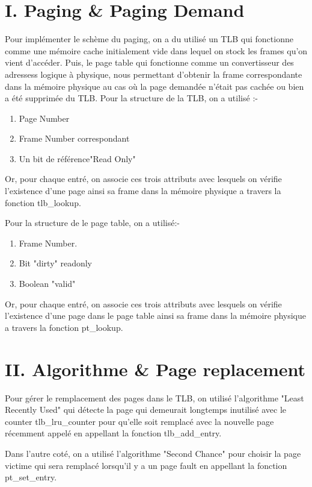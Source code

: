 \documentclass{article}
\begin{document}
\section*{I. Paging \& Paging Demand}
Pour implémenter le schème du paging, on a du utilisé un TLB qui fonctionne comme une mémoire cache initialement vide dans lequel on stock les frames qu'on vient d'accéder. Puis, le page table qui fonctionne comme un convertisseur des adressess logique à physique, nous permettant d'obtenir la frame correspondante dans la mémoire physique au cas où la page demandée n'était pas cachée ou bien a été supprimée du TLB.
Pour la structure de la TLB, on a utilisé :-
\begin{enumerate}
	\item Page Number
	\item Frame Number correspondant
	\item Un bit de référence"Read Only" 
\end{enumerate}
Or, pour chaque entré, on associe ces trois attributs avec lesquels on vérifie l'existence d'une page ainsi sa frame dans la mémoire physique a travers la fonction tlb\_lookup. 

Pour la structure de le page table, on a utilisé:-
\begin{enumerate}
	\item Frame Number.
	\item Bit "dirty" readonly
	\item Boolean "valid"
\end{enumerate}
Or, pour chaque entré, on associe ces trois attributs avec lesquels on vérifie l'existence d'une page dans le page table ainsi sa frame dans la mémoire physique a travers la fonction pt\_lookup.


\section*{II. Algorithme \& Page replacement}

Pour gérer le remplacement des pages dans le TLB, on utilisé l'algorithme "Least Recently Used" qui détecte la page qui demeurait longtemps inutilisé avec le counter tlb\_lru\_counter pour qu'elle soit remplacé avec la nouvelle page récemment appelé en appellant la fonction tlb\_add\_entry.

Dans l'autre coté, on a utilisé l'algorithme "Second Chance" pour choisir la page victime qui sera remplacé lorsqu'il y a un page fault en appellant la fonction pt\_set\_entry.
\end{document}
